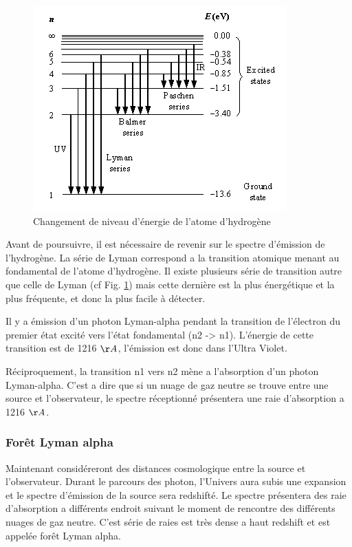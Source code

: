 \begin{figure}[htbp]
\centering
        \includegraphics[width=.95\textwidth]{img/01/lyman.jpg} 
        \caption{Changement de niveau d'énergie de l'atome d'hydrogène}
 		\label{fig:lyman}
\end{figure}

Avant de poursuivre, il est nécessaire  de revenir sur le spectre d’émission de l’hydrogène.
La série de Lyman correspond a la transition atomique menant au fondamental de l'atome d'hydrogène.
Il existe plusieurs série de transition autre que celle de Lyman (cf Fig. \ref{fig:lyman}) mais cette dernière est la plus énergétique et la plus fréquente, et donc la plus facile à détecter.

Il y a émission d'un photon Lyman-alpha pendant la transition de l'électron du premier état excité vers l’état fondamental (n2 -> n1).
L'énergie de cette transition est de 1216 $\AA$, l’émission est donc dans l'Ultra Violet.

Réciproquement, la transition n1 vers n2 mène a l'absorption d'un photon Lyman-alpha.
C'est a dire que si un nuage de gaz neutre se trouve entre une source et l'observateur, le spectre réceptionné présentera une raie d'absorption a 1216 $\AA$.

\subsubsection{Forêt Lyman alpha}


Maintenant considéreront des distances cosmologique entre la source et l'observateur.
Durant le parcours des photon, l'Univers aura subis une expansion et le spectre d'émission de la source sera redshifté.
Le spectre présentera des raie d’absorption a différents endroit suivant le moment de rencontre des différents nuages de gaz neutre.
C'est série de raies est très dense a haut redshift et est appelée forêt Lyman alpha.

